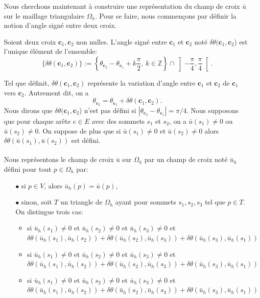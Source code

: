Nous cherchons maintenant à construire une représentation du champ de croix $\bar{u}$ sur le maillage triangulaire $\Omega_h$. Pour se faire, nous commençons par définir la notion d'angle signé entre deux croix.

\begin{definition}
Soient deux croix $\mathbf{c}_1,\mathbf{c}_2$ non nulles. L'angle signé entre $\mathbf{c}_1$ et $\mathbf{c}_2$ noté $\delta\theta(\mathbf{c}_1,\mathbf{c}_2$) est l'unique élément de l'ensemble:
$$
\{\delta\theta(\mathbf{c}_1,\mathbf{c}_2)\}:=\left\{\theta_{\mathbf{c}_2}-\theta_{\mathbf{c}_1}+k\frac{\pi}{2},~k\in\mathbb{Z}\right\}\cap\left]-\frac{\pi}{4}, \frac{\pi}{4}\right[.
$$
\end{definition}
Tel que définit, $\delta\theta(\mathbf{c}_1, \mathbf{c}_2)$ représente la variation d'angle entre $\mathbf{c}_1$ et $\mathbf{c}_2$ de $\mathbf{c}_1$ vers $\mathbf{c}_2$. Autrement dit, on a
$$
\theta_{\mathbf{c}_2}=\theta_{\mathbf{c}_1}+\delta\theta(\mathbf{c}_1,\mathbf{c}_2).
$$
Nous dirons que $\delta\theta(\mathbf{c}_1,\mathbf{c}_2$) n'est pas défini si $|\theta_{\mathbf{c}_2}-\theta_{\mathbf{c}_1}|=\pi/4$.
Nous supposons que pour chaque arête $e\in E$ avec des sommets $s_1$ et $s_2$, on a $\bar{u}(s_1)\neq 0$ ou $\bar{u}(s_2)\neq 0$. On suppose de plus que si $\bar{u}(s_1)\neq 0$ et $\bar{u}(s_2)\neq 0$ alors $\delta\theta(\bar{u}(s_1), \bar{u}(s_2))$ est défini.
\\\\
Nous représentons le champ de croix $\bar{u}$ sur $\Omega_h$ par un champ de croix noté $\bar{u}_h$ défini pour tout $p\in\Omega_h$ par:\\
\begin{itemize}
 \item[$\bullet$] si $p\in V$, alors $\bar{u}_h(p)=\bar{u}(p)$,\\[-0.2cm]
 \item[$\bullet$] sinon, soit $T$ un triangle de $\Omega_h$ ayant pour sommets $s_1, s_2, s_3$ tel que $p\in T$. On distingue trois cas:\\[-0.2cm]
 \begin{itemize}
  \item si $\bar{u}_h(s_1)\neq 0$ et $\bar{u}_h(s_2)\neq 0$ et $\bar{u}_h(s_3)\neq 0$ et $\delta\theta(\bar{u}_h(s_1), \bar{u}_h(s_2))+\delta\theta(\bar{u}_h(s_2), \bar{u}_h(s_3))+\delta\theta(\bar{u}_h(s_3), \bar{u}_h(s_1))$\\[-0.2cm]
  \item si $\bar{u}_h(s_1)\neq 0$ et $\bar{u}_h(s_2)\neq 0$ et $\bar{u}_h(s_3)\neq 0$ et $\delta\theta(\bar{u}_h(s_1), \bar{u}_h(s_2))+\delta\theta(\bar{u}_h(s_2), \bar{u}_h(s_3))+\delta\theta(\bar{u}_h(s_3), \bar{u}_h(s_1))$\\[-0.2cm]
  \item si $\bar{u}_h(s_1)\neq 0$ et $\bar{u}_h(s_2)\neq 0$ et $\bar{u}_h(s_3)\neq 0$ et $\delta\theta(\bar{u}_h(s_1), \bar{u}_h(s_2))+\delta\theta(\bar{u}_h(s_2), \bar{u}_h(s_3))+\delta\theta(\bar{u}_h(s_3), \bar{u}_h(s_1))$
 \end{itemize}
\end{itemize}


